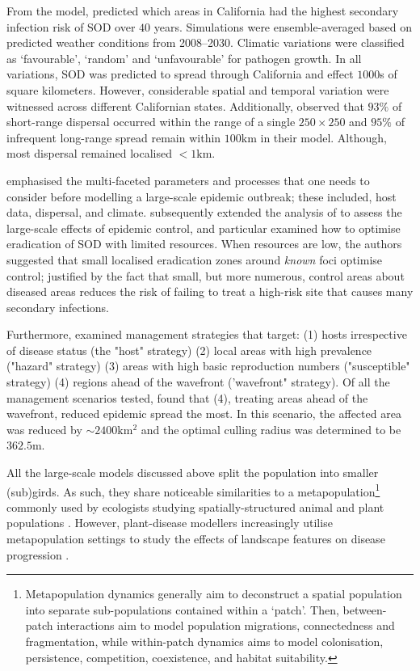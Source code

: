 From the model, \cite{meentemeyer2011epidemiological} predicted which areas in California
had the highest secondary infection risk of SOD over $40$ years.
Simulations were ensemble-averaged based on predicted weather conditions from 2008–2030.
Climatic variations were classified as `favourable', `random' and `unfavourable' for
pathogen growth.
In all variations, SOD was predicted to spread through California and effect $1000$s
of square kilometers. However, considerable spatial and temporal variation were witnessed
across different Californian states. Additionally, \cite{meentemeyer2011epidemiological} 
observed that $93\%$ of short-range dispersal occurred within the range of a single $\mathrm{250 \times 250}$ and 
$95\%$ of infrequent long-range spread remain within $100\mathrm{km}$ in their model.
Although, most dispersal remained localised $<1\mathrm{km}$.

\cite{meentemeyer2011epidemiological} emphasised the multi-faceted 
parameters and processes that one needs to consider before modelling a large-scale epidemic
outbreak; these included, host data, dispersal, and climate.
\cite{large-scale-control} subsequently extended the analysis of \cite{meentemeyer2011epidemiological}
to assess the large-scale effects of epidemic control,
and particular examined how to optimise eradication of SOD with 
limited resources. 
When resources are low, the authors suggested that small localised 
eradication zones around \textit{known} foci optimise control; justified by the fact that
small, but more numerous, control areas about diseased areas reduces the risk of failing 
to treat a high-risk site that causes many secondary infections. 

Furthermore, \cite{large-scale-control} examined management strategies that target:
(1) hosts irrespective of disease 
status (the "host" strategy)
(2) local areas with high prevalence ("hazard" strategy)
(3) areas with high basic reproduction numbers ("susceptible" strategy)
(4) regions ahead of the wavefront ('wavefront" strategy).
Of all the management scenarios tested, \cite{large-scale-control} found
that (4), treating areas ahead of the wavefront, reduced epidemic spread the most.
In this scenario, the affected area was reduced by $\sim 2400\mathrm{km^2}$ and 
the optimal culling radius was determined to be $362.5\mathrm{m}$.

All the large-scale models discussed above split the population into smaller (sub)girds.
As such, they share noticeable similarities to a metapopulation\footnote{
Metapopulation dynamics generally aim to deconstruct a spatial population into separate sub-populations
contained within a `patch'. Then, between-patch interactions aim to model population migrations, 
connectedness and fragmentation, while within-patch dynamics aims to model colonisation, persistence,
competition, coexistence, and habitat suitability.} commonly used by ecologists studying spatially-structured
animal and plant populations \cite{hanski1998metapopulation}. However, plant-disease modellers increasingly
utilise metapopulation settings to study the effects of landscape features on disease progression  \cite{beninca2020trade, soubeyrand2009spatiotemporal, doi:10.1046/j.1461-0248.2002.00378.x}.

